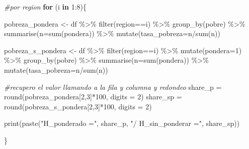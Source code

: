 \documentclass[
]{book}
\newenvironment{Shaded}{\begin{snugshade}}{\end{snugshade}}
\newcommand{\AttributeTok}[1]{\textcolor[rgb]{0.77,0.63,0.00}{#1}}
\newcommand{\CommentTok}[1]{\textcolor[rgb]{0.56,0.35,0.01}{\textit{#1}}}
\newcommand{\ControlFlowTok}[1]{\textcolor[rgb]{0.13,0.29,0.53}{\textbf{#1}}}
\newcommand{\DecValTok}[1]{\textcolor[rgb]{0.00,0.00,0.81}{#1}}
\newcommand{\FunctionTok}[1]{\textcolor[rgb]{0.00,0.00,0.00}{#1}}
\newcommand{\NormalTok}[1]{#1}
\newcommand{\OtherTok}[1]{\textcolor[rgb]{0.56,0.35,0.01}{#1}}
\newcommand{\SpecialCharTok}[1]{\textcolor[rgb]{0.00,0.00,0.00}{#1}}
\newcommand{\StringTok}[1]{\textcolor[rgb]{0.31,0.60,0.02}{#1}}
\begin{document}
\begin{Shaded}
\begin{Highlighting}[]
\CommentTok{\#por region}
\ControlFlowTok{for}\NormalTok{ (i }\ControlFlowTok{in} \DecValTok{1}\SpecialCharTok{:}\DecValTok{8}\NormalTok{)\{}
  
\NormalTok{  pobreza\_pondera }\OtherTok{\textless{}{-}}\NormalTok{ df }\SpecialCharTok{\%\textgreater{}\%} \FunctionTok{filter}\NormalTok{(region}\SpecialCharTok{==}\NormalTok{i) }\SpecialCharTok{\%\textgreater{}\%} 
                            \FunctionTok{group\_by}\NormalTok{(pobre) }\SpecialCharTok{\%\textgreater{}\%} \FunctionTok{summarise}\NormalTok{(}\AttributeTok{n=}\FunctionTok{sum}\NormalTok{(pondera)) }\SpecialCharTok{\%\textgreater{}\%} 
                                                \FunctionTok{mutate}\NormalTok{(}\AttributeTok{tasa\_pobreza=}\NormalTok{n}\SpecialCharTok{/}\FunctionTok{sum}\NormalTok{(n))}
  
\NormalTok{  pobreza\_s\_pondera }\OtherTok{\textless{}{-}}\NormalTok{ df }\SpecialCharTok{\%\textgreater{}\%} \FunctionTok{filter}\NormalTok{(region}\SpecialCharTok{==}\NormalTok{i) }\SpecialCharTok{\%\textgreater{}\%}
                              \FunctionTok{mutate}\NormalTok{(}\AttributeTok{pondera=}\DecValTok{1}\NormalTok{) }\SpecialCharTok{\%\textgreater{}\%} 
                              \FunctionTok{group\_by}\NormalTok{(pobre) }\SpecialCharTok{\%\textgreater{}\%} \FunctionTok{summarise}\NormalTok{(}\AttributeTok{n=}\FunctionTok{sum}\NormalTok{(pondera)) }\SpecialCharTok{\%\textgreater{}\%}
                                                  \FunctionTok{mutate}\NormalTok{(}\AttributeTok{tasa\_pobreza=}\NormalTok{n}\SpecialCharTok{/}\FunctionTok{sum}\NormalTok{(n))}
  
  \CommentTok{\#recupero el valor llamando a la fila y columna y redondeo }
\NormalTok{  share\_p }\OtherTok{=} \FunctionTok{round}\NormalTok{(pobreza\_pondera[}\DecValTok{2}\NormalTok{,}\DecValTok{3}\NormalTok{]}\SpecialCharTok{*}\DecValTok{100}\NormalTok{, }\AttributeTok{digits =} \DecValTok{2}\NormalTok{)}
\NormalTok{  share\_sp }\OtherTok{=} \FunctionTok{round}\NormalTok{(pobreza\_s\_pondera[}\DecValTok{2}\NormalTok{,}\DecValTok{3}\NormalTok{]}\SpecialCharTok{*}\DecValTok{100}\NormalTok{, }\AttributeTok{digits =} \DecValTok{2}\NormalTok{)}
  
  \FunctionTok{print}\NormalTok{(}\FunctionTok{paste}\NormalTok{(}\StringTok{"H\_ponderado ="}\NormalTok{, share\_p, }\StringTok{"/ H\_sin\_ponderar ="}\NormalTok{, share\_sp))}
  
\NormalTok{\}}
\end{Highlighting}
\end{Shaded}
\end{document}
